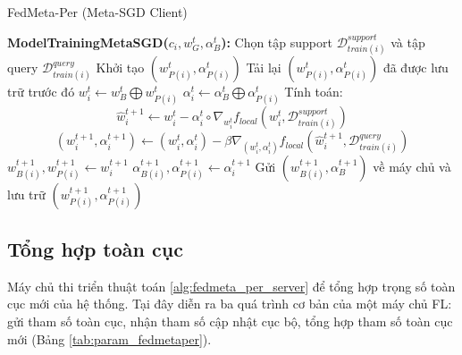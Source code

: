 \begin{algorithm}
    \caption{FedMeta-Per (Meta-SGD Client)} \label{alg:fedsgd_per_client}
    \begin{algorithmic}[1]
        \State\textbf{ModelTrainingMetaSGD($c_i, w_G^t, \alpha_B^t$):}
        \State Chọn tập support $\mathcal{D}_{train(i)}^{support}$ và tập query $\mathcal{D}_{train(i)}^{query}$
            \State Khởi tạo $(w_{P(i)}^t, \alpha_{P(i)}^t)$
        \Else
            \State Tải lại $(w_{P(i)}^t, \alpha_{P(i)}^t)$ đã được lưu trữ trước đó
        \EndIf
        \State $w_i^t \gets w_B^t \bigoplus w_{P(i)}^t$ 
        \State $\alpha_i^t \gets \alpha_B^t \bigoplus \alpha_{P(i)}^t$ 
        \State Tính toán:
        \begin{dmath*}
            \hat{w}_{i}^{t+1} \gets w_{i}^t - \alpha_i^t\circ\nabla_{w_i^t} f_{local}(w_{i}^t, \mathcal{D}_{train(i)}^{support})
        \end{dmath*}
        \begin{dmath*}
            (w_{i}^{t+1}, \alpha_i^{t+1}) \gets (w_{i}^t, \alpha_{i}^{t}) - \beta\nabla_{(w_i^t, \alpha_i^t)} f_{local}(\hat{w}_{i}^{t+1}, \mathcal{D}_{train(i)}^{query})
        \end{dmath*}
        \State $w_{B(i)}^{t+1}, w_{P(i)}^{t+1} \gets w_i^{t+1}$ 
        \State $\alpha_{B(i)}^{t+1}, \alpha_{P(i)}^{t+1} \gets \alpha_i^{t+1}$ 
        \State Gửi $(w_{B(i)}^{t+1}, \alpha_B^{t+1})$ về máy chủ và lưu trữ $(w_{P(i)}^{t+1}, \alpha_{P(i)}^{t+1})$
    \end{algorithmic}
\end{algorithm}

\subsection{Tổng hợp toàn cục}

Máy chủ thi triển thuật toán \ref{alg:fedmeta_per_server} để tổng hợp trọng số toàn cục mới của hệ thống. Tại đây diễn ra ba quá trình cơ bản của một máy chủ FL: gửi tham số toàn cục, nhận tham số cập nhật cục bộ, tổng hợp tham số toàn cục mới (Bảng \ref{tab:param_fedmetaper}).

